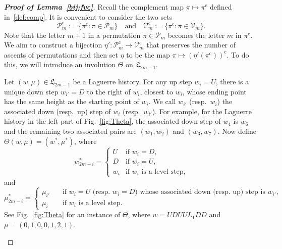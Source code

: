 \documentclass[11pt,reqno]{amsart}
\numberwithin{equation}{section}
\theoremstyle{plain}
\theoremstyle{definition}
\def\Lag{\mathfrak{L}}
\begin{document}
\begin{proof}[{\bf Proof of Lemma~\ref{bij:fvc}}] Recall the complement map $\pi\mapsto \pi^{\mathrm{c}}$ defined in~\eqref{def:comp}. It is convenient to consider the two sets
$$
\mathcal{P}_m^{\mathrm{c}}:=\{\pi^{\mathrm{c}}: \pi\in \mathcal{P}_m\}\quad\text{and}\quad \mathcal{V}_m^{\mathrm{c}}:=\{\pi^{\mathrm{c}}: \pi\in \mathcal{V}_m\}.
$$
Note that the letter $m+1$ in a permutation $\pi\in \mathcal{P}_m$ becomes the letter $m$ in $\pi^{\mathrm{c}}$. We aim to construct a bijection $\eta': \mathcal{P}_m^{\mathrm{c}}\rightarrow \mathcal{V}_m^{\mathrm{c}}$ that preserves the number of ascents of permutations and then set $\eta$ to be the map $\pi\mapsto (\eta'(\pi^{\mathrm{c}}))^{\mathrm{c}}$. To do this, we will introduce an involution $\Theta$ on $\Lag_{2m-1}$.

Let $(w,\mu)\in\Lag_{2m-1}$ be a Laguerre history. For any up step $w_i=U$, there is a unique down step $w_{i'}=D$ to the right of $w_i$, closest to $w_i$,  whose ending point has the same height as the starting point of $w_i$. We call $w_{i'}$ (resp.~$w_i$) the associated down (resp.~up) step of $w_i$ (resp.~$w_{i'}$). For example, for the Laguerre history in the left part of Fig.~\ref{fig:Theta}, the associated down step of $w_4$ is $w_6$ and the remaining two associated pairs are $(w_1,w_2)$ and $(w_3,w_7)$. Now define $\Theta(w,\mu)=(w^*,\mu^*)$, where
$$
w_{2m-i}^*=\begin{cases}
U & \text{if $w_i=D$,}\\
D & \text{if $w_i=U$,}\\
w_i & \text{if $w_i$ is a level step,}
\end{cases}
$$
and
$$
\mu_{2m-i}^*=
\begin{cases}
\mu_{i'} \quad&\text{if $w_i=U$ (resp.~$w_i=D$) whose associated down (resp.~up) step is $w_{i'}$},\\
\mu_{i} &\text{if $w_i$ is a level step}.
\end{cases}
$$
See Fig.~\ref{fig:Theta} for an instance of $\Theta$, where $w=UDUUL_1DD$ and $\mu=(0,1,0,0,1,2,1)$.

\begin{figure}[ht]
\centering
{}
\end{figure}
\end{proof}
\end{document}
